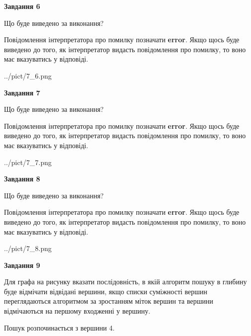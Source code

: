 \documentclass[12pt, ukrainian]{article}
\begin{document}
{\begin {large}
{\begin {center}\textbf{Завдання 6}\end {center}}\par
Що буде виведено за виконання?

Повідомлення інтерпретатора про помилку позначати \textbf{error}.
Якщо щось буде виведено до того, як інтерпретатор видасть повідомлення про помилку, 
то воно має вказуватись у відповіді. \par


\begin{center}
	{../pict/7_6.png}
\end{center}
\newpage

{\begin {center}\textbf{Завдання 7}\end {center}}\par
Що буде виведено за виконання?

Повідомлення інтерпретатора про помилку позначати \textbf{error}.
Якщо щось буде виведено до того, як інтерпретатор видасть повідомлення про помилку, 
то воно має вказуватись у відповіді. \par


\begin{center}
	{../pict/7_7.png}
\end{center}
\newpage

{\begin {center}\textbf{Завдання 8}\end {center}}\par
Що буде виведено за виконання?

Повідомлення інтерпретатора про помилку позначати \textbf{error}.
Якщо щось буде виведено до того, як інтерпретатор видасть повідомлення про помилку, 
то воно має вказуватись у відповіді. \par


\begin{center}
	{../pict/7_8.png}
\end{center}
\newpage

{\begin {center}\textbf{Завдання 9}\end {center}}\par
Для графа на рисунку вказати послідовність, в якій алгоритм пошуку в глибину буде відмічати відвідані вершини, якщо списки суміжності вершин переглядаються алгоритмом за зростанням міток вершин та вершини відмічаються на першому вход\-женні у вершину.\par
Пошук розпочинається з вершини 4.\par


\end{large}}
\end{document}
